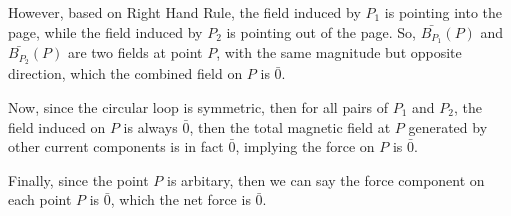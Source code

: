 \documentclass{article}
\begin{document}
However, based on Right Hand Rule, the field induced by $P_1$ is pointing into the page, while the field induced by $P_2$ is pointing out of the page.
So, $\bar{B_{P_1}}(P)$ and $\bar{B_{P_2}}(P)$ are two fields at point $P$, with the same magnitude but opposite direction, which the combined field on $P$ is $\bar{0}$.

\hfill

Now, since the circular loop is symmetric, then for all pairs of $P_1$ and $P_2$, the field induced on $P$ is always $\bar{0}$, then the total magnetic field at $P$
generated by other current components is in fact $\bar{0}$, implying the force on $P$ is $\bar{0}$.

\hfill

Finally, since the point $P$ is arbitary, then we can say the force component on each point $P$ is $\bar{0}$, which the net force is $\bar{0}$.
\end{document}

